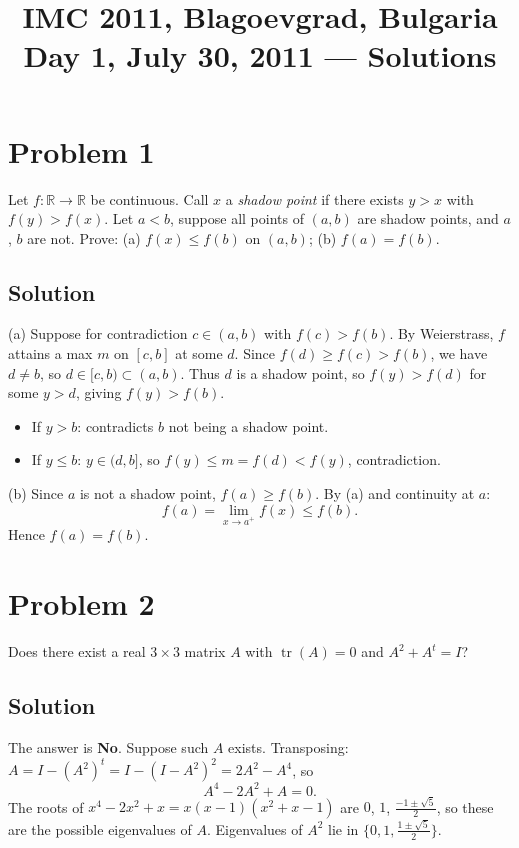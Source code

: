 \documentclass{article}
\title{IMC 2011, Blagoevgrad, Bulgaria \\ Day 1, July 30, 2011 --- Solutions}
\date{}
\begin{document}
\maketitle

\section*{Problem 1}
Let $f : \mathbb{R} \to \mathbb{R}$ be continuous. Call $x$ a \emph{shadow point} if there exists $y > x$ with $f(y) > f(x)$. Let $a < b$, suppose all points of $(a, b)$ are shadow points, and $a$, $b$ are not. Prove: (a) $f(x) \le f(b)$ on $(a,b)$; (b) $f(a) = f(b)$.

\subsection*{Solution}
(a) Suppose for contradiction $c \in (a,b)$ with $f(c) > f(b)$. By Weierstrass, $f$ attains a max $m$ on $[c,b]$ at some $d$. Since $f(d) \ge f(c) > f(b)$, we have $d \ne b$, so $d \in [c, b) \subset (a, b)$. Thus $d$ is a shadow point, so $f(y) > f(d)$ for some $y > d$, giving $f(y) > f(b)$.
\begin{itemize}
  \item If $y > b$: contradicts $b$ not being a shadow point.
  \item If $y \le b$: $y \in (d, b]$, so $f(y) \le m = f(d) < f(y)$, contradiction.
\end{itemize}

(b) Since $a$ is not a shadow point, $f(a) \ge f(b)$. By (a) and continuity at $a$:
\[
f(a) = \lim_{x \to a^+} f(x) \le f(b).
\]
Hence $f(a) = f(b)$.

\section*{Problem 2}
Does there exist a real $3 \times 3$ matrix $A$ with $\operatorname{tr}(A) = 0$ and $A^2 + A^t = I$?

\subsection*{Solution}
The answer is \textbf{No}. Suppose such $A$ exists. Transposing: $A = I - (A^2)^t = I - (I - A^2)^2 = 2A^2 - A^4$, so
\[
A^4 - 2A^2 + A = 0.
\]
The roots of $x^4 - 2x^2 + x = x(x-1)(x^2 + x - 1)$ are $0$, $1$, $\tfrac{-1 \pm \sqrt{5}}{2}$, so these are the possible eigenvalues of $A$. Eigenvalues of $A^2$ lie in $\{0, 1, \tfrac{1 \pm \sqrt{5}}{2}\}$.
\end{document}
